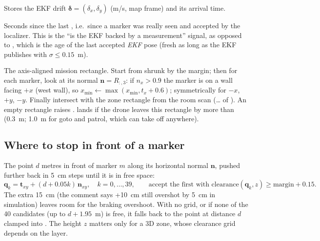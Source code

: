 Stores the EKF drift $\boldsymbol\delta = (\delta_x, \delta_y)$ (m/s, map frame) and its arrival time.

Seconds since the last , i.e.\ since a marker was really seen and accepted by the localizer.
This is the ``is the EKF backed by a measurement'' signal, as opposed to , which is the age of
the last accepted \emph{EKF} pose (fresh as long as the EKF publishes with $\sigma \le 0.15$~m).

The axis-aligned mission rectangle. Start from  shrunk by the margin; then for each marker, look
at its normal $\mathbf n = R_{:,3}$: if $n_x > 0.9$ the marker is on a wall facing $+x$ (west wall), so
$x_{\min} \leftarrow \max(x_{\min}, t_x + 0.6)$; symmetrically for $-x$, $+y$, $-y$. Finally intersect with the
zone rectangle from the room scan (\dots{} of ).
An empty rectangle raises .  lands if the drone leaves this rectangle by more
than  (0.3~m; 1.0~m for goto and patrol, which can take off anywhere).

\subsection{Where to stop in front of a marker}

The point $d$ metres in front of marker $m$ along its horizontal normal $\mathbf n$, pushed further back in
5~cm steps until it is in free space:
$$
\mathbf q_k = \mathbf t_{xy} + (d + 0.05k)\,\mathbf n_{xy}, \quad k = 0,\dots,39,
\qquad \text{accept the first with } \text{clearance}(\mathbf q_k, z) \ge \text{margin} + 0.15 .
$$
The extra 15~cm (the comment says +10~cm still overshot by 5~cm in simulation) leaves room for the braking
overshoot. With no grid, or if none of the 40 candidates (up to $d + 1.95$~m) is free, it falls back to the
point at distance $d$ clamped into . The height $z$ matters only for a 3D zone, whose clearance
grid depends on the layer.

